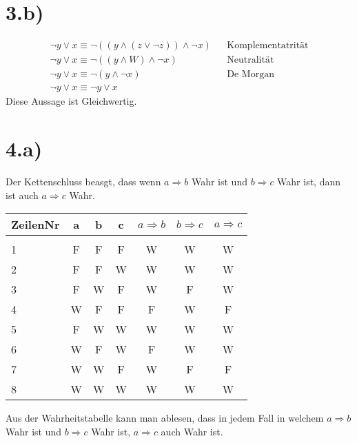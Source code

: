 \documentclass[10pt,ngerman]{scrartcl}
\begin{document}
\section{3.b)}
\setcounter{equation}{0}
\begin{align}
\neg y \vee x \equiv \neg (( y \wedge (z \vee \neg z)) \wedge \neg x)&& \text{Komplementatrität}\\
\neg y \vee x \equiv \neg (( y \wedge W ) \wedge \neg x) && \text{Neutralität}\\
\neg y \vee x \equiv \neg ( y \wedge \neg x)  && \text{De Morgan}\\
\neg y \vee x \equiv \neg y \vee x
\end{align}
\flushleft Diese Aussage ist Gleichwertig.
\pagebreak
\section{4.a)}
Der Kettenschluss beasgt, dass wenn $a \Rightarrow b$ Wahr ist und $b \Rightarrow c$ Wahr ist, dann ist auch $a \Rightarrow c$ Wahr.
\begin{table}[H]
\begin{center}
\begin{tabular}{l|c|c|c|c|c|c|}
ZeilenNr & a & b & c & $a \Rightarrow b$ & $b \Rightarrow c$ & $a \Rightarrow c$ \\
\hline
&&&&&&\\
1 & F & F & F & \color{blue}W\color{black} & \color{blue}W\color{black} & \color{blue}W\color{black}\\
2 & F & F & W & \color{blue}W\color{black} & \color{blue}W\color{black} & \color{blue}W\color{black}\\
3 & F & W & F & W & F & W\\
4 & W & F & F & F & W & F\\
5 & F & W & W & \color{blue}W\color{black} & \color{blue}W\color{black} & \color{blue}W\color{black}\\
6 & W & F & W & F & W & W\\
7 & W & W & F & W & F & F\\
8 & W & W & W & \color{blue}W\color{black} & \color{blue}W\color{black} & \color{blue}W\color{black}\\
\end{tabular}
\end{center}
\end{table}
Aus der Wahrheitstabelle kann man ablesen, dass in jedem Fall in welchem $a \Rightarrow b$ Wahr ist und $b \Rightarrow c$ Wahr ist, $a \Rightarrow c$ auch Wahr ist.
\end{document}
